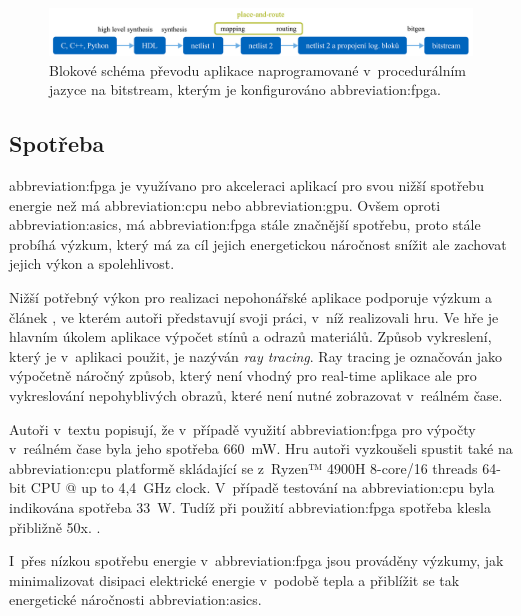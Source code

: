 \documentclass[a4paper, twoside, 11pt]{article}
\newcommand{\fbar}{\FloatBarrier}
\begin{document}
			
			\begin{figure}[htbp!]
				\centering
					\includegraphics[width=1\textwidth]{src/pdf/fpga-hls-to-bitstream-flow-chart.pdf} 
					\caption{Blokové schéma převodu aplikace naprogramované v~procedurálním jazyce na bitstream, kterým je konfigurováno \gls{abbreviation:fpga}.}
					\label{fig:fpga-hls-to-bitstream-flow-chart}
			\end{figure}

		\fbar
		\subsection{Spotřeba}
			\gls{abbreviation:fpga} je využívano pro akceleraci aplikací pro svou nižší spotřebu energie než má \gls{abbreviation:cpu} nebo \gls{abbreviation:gpu}. Ovšem oproti \gls{abbreviation:asics}, má \gls{abbreviation:fpga} stále značnější spotřebu, proto stále probíhá výzkum, který má za cíl jejich energetickou náročnost snížit ale zachovat jejich výkon a spolehlivost.\par
			Nižší potřebný výkon pro realizaci nepohonářské aplikace podporuje výzkum a článek \cite{rovere-sphery-vs-shapes}, ve kterém autoři představují svoji práci, v~níž realizovali hru. Ve hře je hlavním úkolem aplikace výpočet stínů a odrazů materiálů. Způsob vykreslení, který je v~aplikaci použit, je nazýván \textit{ray tracing}. Ray tracing je označován jako výpočetně náročný způsob, který není vhodný pro real-time aplikace ale pro vykreslování nepohyblivých obrazů, které není nutné zobrazovat v~reálném čase. \cite{wikipedia-ray-tracing}\par
			Autoři v~textu popisují, že v~případě využití \gls{abbreviation:fpga} pro výpočty v~reálném čase byla jeho spotřeba 660~mW. Hru autoři vyzkoušeli spustit také na \gls{abbreviation:cpu} platformě skládající se z~Ryzen™️ 4900H 8-core/16 threads 64-bit CPU @ up to 4,4~GHz clock. V~případě testování na \gls{abbreviation:cpu} byla indikována spotřeba 33~W. Tudíž při použití \gls{abbreviation:fpga} spotřeba klesla přibližně 50x. \cite{rovere-sphery-vs-shapes}.\par
			I~přes nízkou spotřebu energie v~\gls{abbreviation:fpga} jsou prováděny výzkumy, jak minimalizovat disipaci elektrické energie v~podobě tepla a přiblížit se tak energetické náročnosti \gls{abbreviation:asics}.\par
\end{document}
